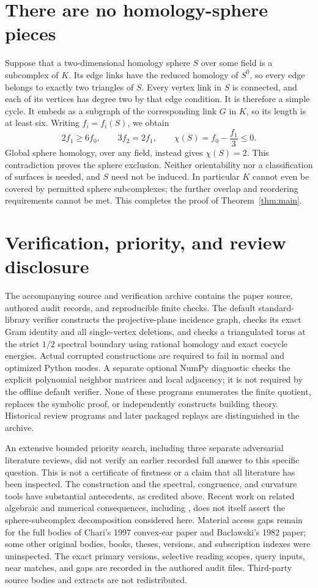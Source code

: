 \documentclass[10pt]{article}
\begin{document}
\section{There are no homology-sphere pieces}
Suppose that a two-dimensional homology sphere $S$ over some field is a
subcomplex of $K$. Its edge links have the reduced homology of $S^0$, so
every edge belongs to exactly two triangles of $S$. Every vertex link in $S$
is connected, and each of its vertices has degree two by that edge condition.
It is therefore a simple cycle. It embeds as a subgraph of the corresponding
link $G$ in $K$, so its length is at least six. Writing $f_i=f_i(S)$, we obtain
\[
                 2f_1\geq6f_0,\qquad 3f_2=2f_1,
 \qquad
                 \chi(S)=f_0-\frac{f_1}{3}\leq0.
\]
Global sphere homology, over any field, instead gives $\chi(S)=2$.
This contradiction proves the sphere exclusion. Neither orientability nor
a classification of surfaces is needed, and $S$ need not be induced.
In particular $K$ cannot even be covered by permitted sphere subcomplexes;
the further overlap and reordering requirements cannot be met. This completes
the proof of Theorem~\ref{thm:main}.

\section*{Verification, priority, and review disclosure}
The accompanying source and verification archive contains the paper source,
authored audit records, and reproducible finite checks. The default
standard-library verifier constructs the projective-plane incidence graph,
checks its exact Gram identity and all single-vertex deletions, and checks
a triangulated torus at the strict $1/2$ spectral boundary using rational
homology and exact cocycle energies. Actual corrupted constructions are
required to fail in normal and optimized Python modes.
A separate optional NumPy diagnostic checks the explicit polynomial
neighbor matrices and local adjacency; it is not required by the offline
default verifier. None of these programs enumerates the finite quotient,
replaces the symbolic proof, or independently constructs building theory.
Historical review programs and later packaged replays are distinguished
in the archive.

An extensive bounded priority search, including three separate adversarial
literature reviews, did not verify an earlier recorded full answer to this
specific question. This is not a certificate of firstness or a claim that
all literature has been inspected. The construction and the spectral,
congruence, and curvature tools have substantial antecedents, as credited
above. Recent work on related algebraic and numerical consequences, including
\cite{LarsonStapledon}, does not itself assert the sphere-subcomplex
decomposition considered here. Material access gaps remain for the full
bodies of Chari's 1997 convex-ear paper and Baclawski's 1982 paper; some other
original bodies, books, theses, versions, and subscription indexes were
uninspected. The exact primary versions, selective reading scopes, query
inputs, near matches, and gaps are recorded in the authored audit files.
Third-party source bodies and extracts are not redistributed.
\end{document}

